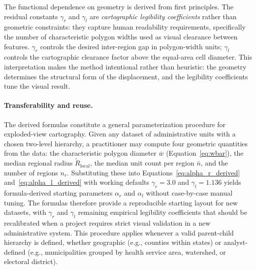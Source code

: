 \documentclass[12pt, a4paper]{article}
\numberwithin{equation}{section}
\begin{document}
The functional dependence on geometry is derived from first principles. The residual constants $\gamma_r$ and $\gamma_l$ are \emph{cartographic legibility coefficients} rather than geometric constraints: they capture human readability requirements, specifically the number of characteristic polygon widths used as visual clearance between features. $\gamma_r$ controls the desired inter-region gap in polygon-width units; $\gamma_l$ controls the cartographic clearance factor above the equal-area cell diameter. This interpretation makes the method intentional rather than heuristic: the geometry determines the structural form of the displacement, and the legibility coefficients tune the visual result.

\paragraph{Transferability and reuse.}
The derived formulas constitute a general parameterization procedure for exploded-view cartography. Given any dataset of administrative units with a chosen two-level hierarchy, a practitioner may compute four geometric quantities from the data: the characteristic polygon diameter $\bar{w}$ (Equation~\eqref{eq:wbar}), the median regional radius $\widetilde{R}_{\text{local}}$, the median unit count per region $\bar{n}$, and the number of regions $n_r$. Substituting these into Equations~\eqref{eq:alpha_r_derived} and~\eqref{eq:alpha_l_derived} with working defaults $\gamma_r = 3.0$ and $\gamma_l = 1.136$ yields formula-derived starting parameters $\alpha_r$ and $\alpha_l$ without case-by-case manual tuning. The formulas therefore provide a reproducible starting layout for new datasets, with $\gamma_r$ and $\gamma_l$ remaining empirical legibility coefficients that should be recalibrated when a project requires strict visual validation in a new administrative system. This procedure applies whenever a valid parent-child hierarchy is defined, whether geographic (e.g., counties within states) or analyst-defined (e.g., municipalities grouped by health service area, watershed, or electoral district).
\end{document}
